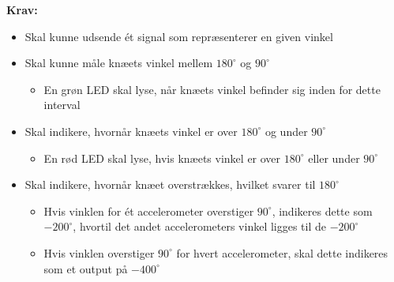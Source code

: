 \vspace{3mm}
\textbf{Krav:}
\begin{itemize}
\item[\text{\sffamily \checkmark}] Skal kunne udsende ét signal som repræsenterer en given vinkel
\item[\text{\sffamily \checkmark}] Skal kunne måle knæets vinkel mellem $180^{\circ}$ og $90^{\circ}$
\begin{itemize}
\item En grøn LED skal lyse, når knæets vinkel befinder sig inden for dette interval
\end{itemize}
\item[\text{\sffamily \checkmark}] Skal indikere, hvornår knæets vinkel er over $180^{\circ}$ og under $90^{\circ}$
\begin{itemize}
\item En rød LED skal lyse, hvis knæets vinkel er over $180^{\circ}$ eller under $90^{\circ}$
\end{itemize}
\item[\text{\sffamily \checkmark}] Skal indikere, hvornår knæet overstrækkes, hvilket svarer til $180^{\circ}$
\begin{itemize}
\item Hvis vinklen for ét accelerometer overstiger $90^{\circ}$, indikeres dette som $-200^{\circ}$, hvortil det andet accelerometers vinkel ligges til de $-200^{\circ}$
\item Hvis vinklen overstiger $90^{\circ}$ for hvert accelerometer, skal dette indikeres som et output på $-400^{\circ}$
\end{itemize}
\end{itemize}